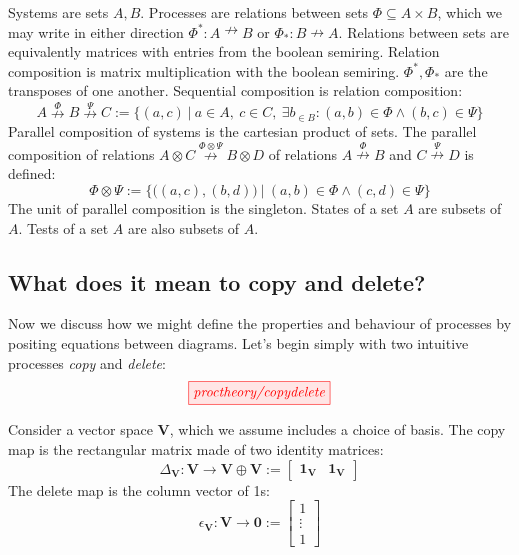 \begin{example}
Systems are sets $A,B$. Processes are relations between sets $\Phi \subseteq A \times B$, which we may write in either direction $\Phi^*: A \nrightarrow B$ or $\Phi_*: B \nrightarrow A$. Relations between sets are equivalently matrices with entries from the boolean semiring. Relation composition is matrix multiplication with the boolean semiring. $\Phi^*,\Phi_*$ are the transposes of one another. Sequential composition is relation composition:
\[A \overset{\Phi}{\nrightarrow} B \overset{\Psi}{\nrightarrow} C := \{(a,c) \ | \  a \in A, \ c \in C, \ \exists b_{\in B}: (a,b) \in \Phi \wedge (b,c) \in \Psi  \}\]
Parallel composition of systems is the cartesian product of sets. The parallel composition of relations $A \otimes C \overset{\Phi \otimes \Psi}{\nrightarrow} B \otimes D$ of relations $A \overset{\Phi}{\nrightarrow} B$ and $C \overset{\Psi}{\nrightarrow} D$ is defined:
\[\Phi \otimes \Psi := \{\big( (a,c) , (b,d) \big) \ | \ (a,b) \in \Phi \wedge (c,d) \in \Psi\}\]
The unit of parallel composition is the singleton. States of a set $A$ are subsets of $A$. Tests of a set $A$ are also subsets of $A$.
\end{example}

\subsection{What does it mean to copy and delete?}

Now we discuss how we might define the properties and behaviour of processes by positing equations between diagrams. Let's begin simply with two intuitive processes \emph{copy} and \emph{delete}:
\[\tikzfig{proctheory/copydelete}\]

\begin{example}
Consider a vector space $\mathbf{V}$, which we assume includes a choice of basis. The copy map is the rectangular matrix made of two identity matrices:
\[\Delta_\mathbf{V}: \mathbf{V} \rightarrow \mathbf{V} \oplus \mathbf{V} := \begin{bmatrix} \mathbf{1}_\mathbf{V} & \mathbf{1}_\mathbf{V} \end{bmatrix}\]
The delete map is the column vector of 1s:
\[\epsilon_\mathbf{V}: \mathbf{V} \rightarrow \mathbf{0} := \begin{bmatrix} 1 \\ \vdots \\ 1 \end{bmatrix}\]
\end{example}

